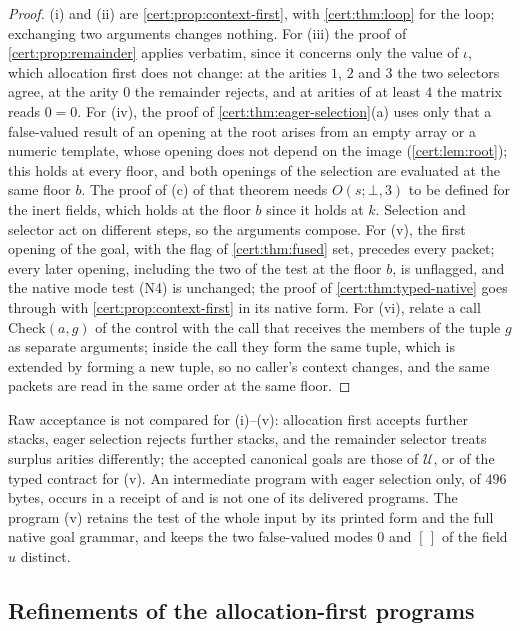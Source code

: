 \begin{proof}
(i) and (ii) are \cref{cert:prop:context-first}, with \cref{cert:thm:loop} for
the loop; exchanging two arguments changes nothing. For (iii) the proof of
\cref{cert:prop:remainder} applies verbatim, since it concerns only the value
of $\iota$, which allocation first does not change: at the arities $1$, $2$ and
$3$ the two selectors agree, at the arity $0$ the remainder rejects, and at
arities of at least $4$ the matrix reads $0=0$. For (iv), the proof of
\cref{cert:thm:eager-selection}(a) uses only that a false-valued result of an
opening at the root arises from an empty array or a numeric template, whose
opening does not depend on the image (\cref{cert:lem:root}); this holds at
every floor, and both openings of the selection are evaluated at the same
floor $b$. The proof of (c) of that theorem needs $O(s;\bot,3)$ to be defined
for the inert fields, which holds at the floor $b$ since it holds at $k$.
Selection and selector act on different steps, so the arguments compose. For
(v), the first opening of the goal, with the flag of \cref{cert:thm:fused}
set, precedes every packet; every later opening, including the two of the
test at the floor $b$, is unflagged, and the native mode test (N4) is
unchanged; the proof of \cref{cert:thm:typed-native} goes through with
\cref{cert:prop:context-first} in its native form. For (vi), relate a call
$\mathrm{Check}(a,g)$ of the control with the call that receives the members
of the tuple $g$ as separate arguments; inside the call they form the same
tuple, which is extended by forming a new tuple, so no caller's context
changes, and the same packets are read in the same order at the same floor.
\end{proof}

Raw acceptance is not compared for (i)--(v): allocation first accepts further
stacks, eager selection rejects further stacks, and the remainder selector
treats surplus arities differently; the accepted canonical goals are those of
$\mathcal U$, or of the typed contract for (v). An intermediate program with
eager selection only, of $496$ bytes, occurs in a receipt of
 and is not one of its delivered programs. The program (v)
retains the test of the whole input by its printed form and the full native
goal grammar, and keeps the two false-valued modes $0$ and $[\,]$ of the
field $u$ distinct.

\subsection{Refinements of the allocation-first programs}\label{cert:sec:after-first}

